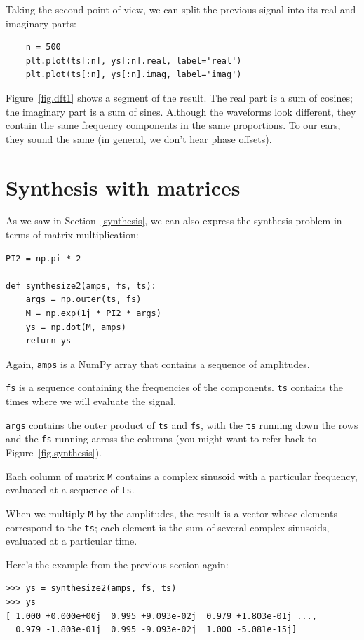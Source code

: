 \documentclass[12pt]{book}
\begin{document}
Taking the second point of view, we can split the previous
signal into its real and imaginary parts:

\begin{verbatim}
    n = 500
    plt.plot(ts[:n], ys[:n].real, label='real')
    plt.plot(ts[:n], ys[:n].imag, label='imag')
\end{verbatim}

Figure~\ref{fig.dft1} shows a segment of the result.  The
real part is a sum of cosines; the imaginary part is
a sum of sines.  Although the waveforms look different, they
contain the same frequency components in the same proportions.
To our ears, they sound the same (in general, we don't hear
phase offsets).


\section{Synthesis with matrices}
\label{synthmat}

As we saw in Section~\ref{synthesis}, we can also express the synthesis
problem in terms of matrix multiplication:

\begin{verbatim}
PI2 = np.pi * 2

def synthesize2(amps, fs, ts):
    args = np.outer(ts, fs)
    M = np.exp(1j * PI2 * args)
    ys = np.dot(M, amps)
    return ys
\end{verbatim}

Again, {\tt amps} is a NumPy array that contains a sequence of
amplitudes.

{\tt fs} is a sequence containing the frequencies of the
components.  {\tt ts} contains the times where we will evaluate
the signal.

{\tt args} contains the outer product of {\tt ts} and {\tt fs},
with the {\tt ts} running down the rows and the {\tt fs} running
across the columns (you might want to refer back to
Figure~\ref{fig.synthesis}).

Each column of matrix {\tt M} contains a complex sinusoid with
a particular frequency, evaluated at a sequence of {\tt ts}.

When we multiply {\tt M} by the amplitudes, the result is a vector
whose elements correspond to the {\tt ts}; each element is the sum of
several complex sinusoids, evaluated at a particular time.

Here's the example from the previous section again:

\begin{verbatim}
>>> ys = synthesize2(amps, fs, ts)
>>> ys
[ 1.000 +0.000e+00j  0.995 +9.093e-02j  0.979 +1.803e-01j ...,
  0.979 -1.803e-01j  0.995 -9.093e-02j  1.000 -5.081e-15j]
\end{verbatim}
\end{document}
